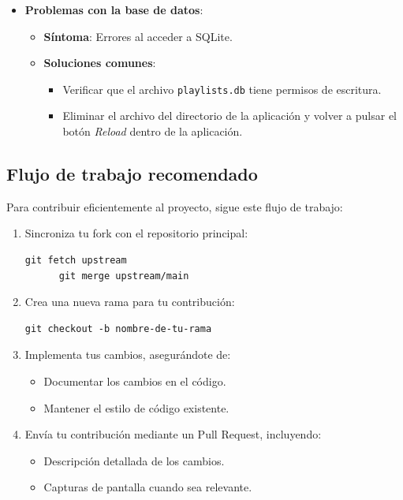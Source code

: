 \documentclass[11pt, a4paper]{article}
\begin{document}
\begin{itemize}
        \item \textbf{Problemas con la base de datos}:
        \begin{itemize}
          \item \textbf{Síntoma}: Errores al acceder a SQLite.
          \item \textbf{Soluciones comunes}:
            \begin{itemize}
              \item Verificar que el archivo \texttt{playlists.db} tiene permisos de escritura.
              \item Eliminar el archivo del directorio de la aplicación y volver a pulsar el botón \textit{Reload} dentro de la aplicación.
            \end{itemize}
        \end{itemize}
    \end{itemize}

  \subsection{Flujo de trabajo recomendado}

  Para contribuir eficientemente al proyecto, sigue este flujo de trabajo:

  \begin{enumerate}
    \item Sincroniza tu fork con el repositorio principal:
      \begin{lstlisting}[caption={Contribuir 1}]
      git fetch upstream
      git merge upstream/main
      \end{lstlisting}
      
    \item Crea una nueva rama para tu contribución:
      \begin{lstlisting}[caption={Contribuir 2}]
      git checkout -b nombre-de-tu-rama
      \end{lstlisting}
      
    \item Implementa tus cambios, asegurándote de:
      \begin{itemize}
        \item Documentar los cambios en el código.
        \item Mantener el estilo de código existente.
      \end{itemize}
      
    \item Envía tu contribución mediante un Pull Request, incluyendo:
      \begin{itemize}
        \item Descripción detallada de los cambios.
        \item Capturas de pantalla cuando sea relevante.
      \end{itemize}
  \end{enumerate}
\end{document}
